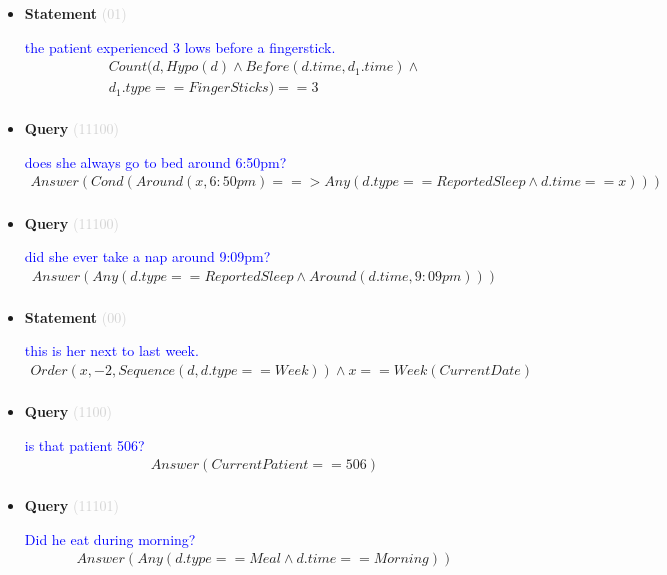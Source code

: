 \documentclass[11pt]{article}
\newcommand{\key}[1]{\textcolor{lightgray}{#1}}
\newcounter{CQuery}
\newcounter{CStatement}
\begin{document}
\begin{itemize}
\item
\textbf{Statement\theCStatement} \key{(01)} \addtocounter{CStatement}{1}
\textcolor{blue}{ the patient experienced 3 lows before a fingerstick. }
\begin{multline*}
Count(d, Hypo(d) \wedge Before(d.time, d_1.time) \wedge \\ 
d_1.type==FingerSticks)==3 \\ 
\end{multline*}


\item
\textbf{Query\theCQuery} \key{(11100)} \addtocounter{CQuery}{1}
\textcolor{blue}{ does she always go to bed around 6:50pm? }
\begin{multline*}
Answer(Cond(Around(x, 6:50pm) ==> Any(d.type==ReportedSleep \wedge d.time==x))) \\ 
\end{multline*}


\item
\textbf{Query\theCQuery} \key{(11100)} \addtocounter{CQuery}{1}
\textcolor{blue}{ did she ever take a nap around 9:09pm? }
\begin{multline*}
Answer(Any(d.type==ReportedSleep \wedge Around(d.time, 9:09pm))) \\ 
\end{multline*}


\item
\textbf{Statement\theCStatement} \key{(00)} \addtocounter{CStatement}{1}
\textcolor{blue}{ this is her next to last week. }
\begin{multline*}
Order(x, -2, Sequence(d, d.type==Week)) \wedge x==Week(CurrentDate) \\ 
\end{multline*}


\item
\textbf{Query\theCQuery} \key{(1100)} \addtocounter{CQuery}{1}
\textcolor{blue}{ is that patient 506? }
\begin{multline*}
Answer(CurrentPatient==506) \\ 
\end{multline*}


\item
\textbf{Query\theCQuery} \key{(11101)} \addtocounter{CQuery}{1}
\textcolor{blue}{ Did he eat during morning? }
\begin{multline*}
Answer(Any(d.type==Meal \wedge d.time==Morning)) \\ 
\end{multline*}



\end{itemize}
\end{document}
